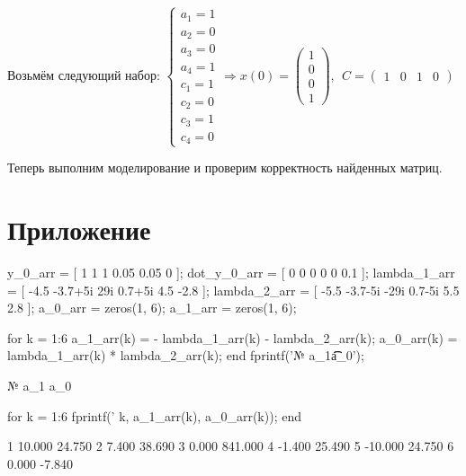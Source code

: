 Возьмём следующий набор: $\left\lbrace \begin{array}{c}
a_1 =1\\
a_2 =0\\
a_3 =0\\
a_4 =1\\
c_1 =1\\
c_2 =0\\
c_3 =1\\
c_4 =0
\end{array}\right.\Rightarrow x(0)=\left(\begin{array}{c}
1\\
0\\
0\\
1
\end{array}\right),~~C=\left(\begin{array}{cccc}
1 & 0 & 1 & 0
\end{array}\right)$



Теперь выполним моделирование и проверим корректность найденных матриц.




\section{Приложение}

\begin{matlabcode}
y_0_arr = [ 1 1 1 0.05 0.05 0 ];
dot_y_0_arr = [ 0 0 0 0 0 0.1 ];
lambda_1_arr = [ -4.5 -3.7+5i 29i 0.7+5i 4.5 -2.8 ];
lambda_2_arr = [ -5.5 -3.7-5i -29i 0.7-5i 5.5 2.8 ];
a_0_arr = zeros(1, 6);
a_1_arr = zeros(1, 6);

for k = 1:6
    a_1_arr(k) = - lambda_1_arr(k) - lambda_2_arr(k);
    a_0_arr(k) = lambda_1_arr(k) * lambda_2_arr(k);
end
fprintf('№  a_1\t\t a_0\n');
\end{matlabcode}
\begin{matlaboutput}
№  a_1		 a_0
\end{matlaboutput}
\begin{matlabcode}
for k = 1:6
    fprintf('%
        k, a_1_arr(k), a_0_arr(k));
end
\end{matlabcode}
\begin{matlaboutput}
1  10.000	 24.750
2   7.400	 38.690
3   0.000	841.000
4  -1.400	 25.490
5 -10.000	 24.750
6   0.000	 -7.840
\end{matlaboutput}


